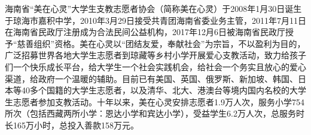 海南省“美在心灵”大学生支教志愿者协会（简称美在心灵）于2008年1月30日诞生于琼海市嘉积中学，2010年3月29日接受共青团海南省委业务主管，2011年7月11日在海南省民政厅注册成为合法民间公益机构，2017年12月6日被海南省民政厅授予“慈善组织”资格。美在心灵以“团结友爱，奉献社会”为宗旨，不以盈利为目的，广泛招募世界各地大学生志愿者到琼藏等乡村小学开展爱心支教活动，致力给孩子们一个快乐成长平台，给大学生一个社会实践机会，给社会一个务实且放心的爱心渠道，给政府一个温暖的辅助。目前已有美国、英国、俄罗斯、新加坡、韩国、日本等40多个国籍的大学生志愿者，以及清华、北大、港澳台等境内国内名校的大学生志愿者参加支教活动。十年以来，美在心灵安排志愿者1.9万人次，服务小学754所次（包括西藏两所小学：恩达小学和宾达小学），受益学生6.2万人次，总服务时长165万小时，总投入善款158万元。
